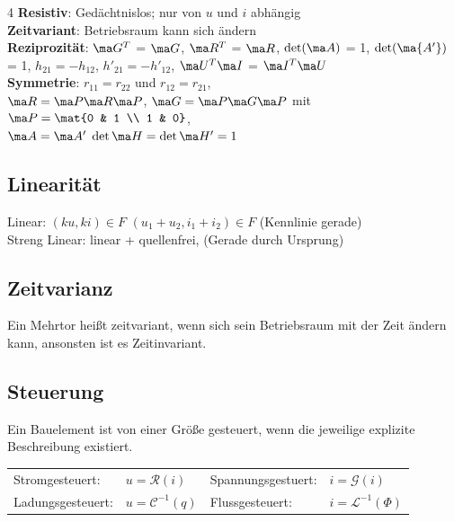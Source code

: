 \documentclass[fs, footer]{latex4ei}
\begin{document}
\begin{multicols*}{4}
    \textbf{Resistiv}: Gedächtnislos; nur von $u$ und $i$ abhängig\\
    \textbf{Zeitvariant}: Betriebsraum kann sich ändern\\
    \textbf{Reziprozität}: $\ma G^T$ = $\ma G$, $\ma R^T$ = $\ma R$, $\det (\ma A)$ = 1, $\det (\ma {A'})$ = 1, $h_{21} = -h_{12}$, $h'_{21} = -h'_{12}$, $\ma U^T\ma I$ = $\ma I^T\ma U$\\
    \textbf{Symmetrie}: $r_{11} = r_{22}$ und $r_{12}=r_{21}$, \\
    $\ma R = \ma P\ma R\ma P$, $\ma G = \ma P \ma G \ma P$ mit $\ma P = \mat{0 & 1 \\ 1 & 0}$, \\
    $\ma A = \ma A'$ \! \! \! \! $\det \ma H = \det \ma H' = 1$


    \subsection{Linearität}
    Linear: $(ku, ki) \in F$ \quad $(u_1 + u_2, i_1 + i_2) \in F$ (Kennlinie gerade) \\
    Streng Linear: linear + quellenfrei, (Gerade durch Ursprung)\\

    \subsection{Zeitvarianz}
    Ein Mehrtor heißt zeitvariant, wenn sich sein Betriebsraum mit der Zeit ändern kann, ansonsten
    ist es Zeitinvariant.

    \subsection{Steuerung}
    Ein Bauelement ist von einer Größe gesteuert, wenn die jeweilige explizite Beschreibung existiert.\\
    \begin{tabular*}{\columnwidth}{@{\extracolsep\fill}llll@{}}
        Stromgesteuert: & $u=\mathcal R(i)$ & Spannungsgestuert: & $i=\mathcal G(i)$\\
        Ladungsgesteuert: & $u=\mathcal C^{-1}(q)$ & Flussgesteuert: & $i=\mathcal L^{-1}(\Phi)$
    \end{tabular*}


\end{multicols*}
\end{document}
